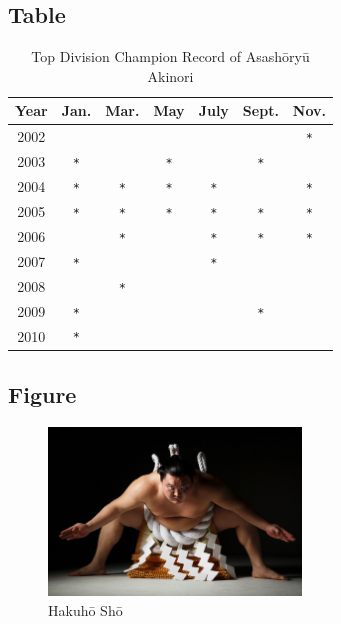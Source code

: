 \documentclass{article}
\begin{document}
    \subsection{Table}
    \begin{table}[htbp]
        \centering
        \begin{tabular}{c|cccccc}
            \hline
            Year & Jan. & Mar. & May & July & Sept. & Nov. \\
            \hline
            2002 &        &        &        &        &        &\verb|*|\\
            2003 &\verb|*|&        &\verb|*|&        &\verb|*|&        \\
            2004 &\verb|*|&\verb|*|&\verb|*|&\verb|*|&        &\verb|*|\\
            2005 &\verb|*|&\verb|*|&\verb|*|&\verb|*|&\verb|*|&\verb|*|\\
            2006 &        &\verb|*|&        &\verb|*|&\verb|*|&\verb|*|\\
            2007 &\verb|*|&        &        &\verb|*|&        &        \\
            2008 &        &\verb|*|&        &        &        &        \\
            2009 &\verb|*|&        &        &        &\verb|*|&        \\
            2010 &\verb|*|&        &        &        &        &        \\
            \hline
        \end{tabular}
        \caption{Top Division Champion Record of Asash\=ory\=u Akinori}
        \label{table} %
    \end{table}
    \subsection{Figure}
    \begin{figure}[htbp]
        \centering
        \includegraphics[width=0.6\textwidth]{img/Hakuho.jpg}
        \caption{Hakuh\=o Sh\=o}
        \label{figure} %
    \end{figure}
\end{document}
